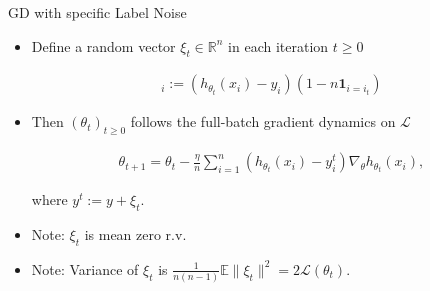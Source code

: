 \documentclass[fleqn]{beamer}
\begin{document}
    \begin{frame}{GD with specific Label Noise}
        \begin{itemize}
            \item Define a random vector $\xi_t \in \mathbb{R}^{n}$ in each iteration
                $t \ge 0$
                \begin{center}
                \begin{minipage}{0.5\textwidth}
                    \begin{align*}
                        [\xi_t]_i := (h_{\theta_t}(x_i) -
                        y_i)(1-n\mathbf{1}_{i=i_t})
                    \end{align*}
                \end{minipage}
                \end{center}
                \vspace{0.5cm}
            \item Then $(\theta_t)_{t\ge0}$ follows the full-batch gradient
                dynamics on $\mathcal{L}$
                \begin{center}
                \begin{minipage}{0.5\textwidth}
                \begin{align*}
                    \theta_{t+1} = \theta_t - \frac{\eta}{n} \sum_{i=1}^{n}
                    \left( h_{\theta_t}(x_i) - y_i^{t} \right)
                    \nabla_{\theta} h_{\theta_t}(x_i),
                \end{align*}
                \end{minipage}
                \end{center}
                where $y^{t}:= y + \xi_t$.
            \item Note: $\xi_t$ is mean zero r.v.
            \item Note: Variance of $\xi_t$ is
                $\frac{1}{n(n-1)}\mathbb{E}\|\xi_t\|^{2} = 2
                \mathcal{L}(\theta_t)$.
        \end{itemize}
    \end{frame}
\end{document}
